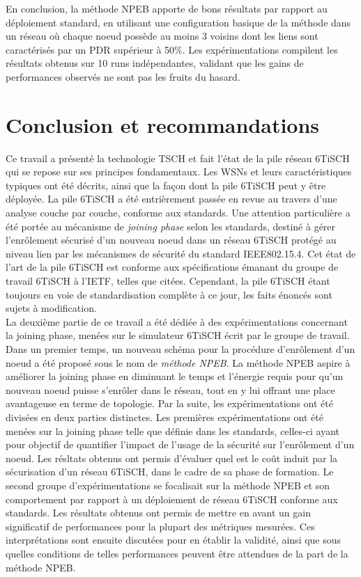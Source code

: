 \documentclass[]{report}
\begin{document}
En conclusion, la méthode NPEB apporte de bons résultats par rapport au déploiement standard, en utilisant une configuration basique de la méthode dans un réseau où chaque noeud possède au moins 3 voisins dont les liens sont caractérisés par un PDR supérieur à 50\%. Les expérimentations compilent les résultats obtenus sur 10 runs indépendantes, validant que les gains de performances observés ne sont pas les fruits du hasard.

\chapter*{Conclusion et recommandations}

\large

Ce travail a présenté la technologie TSCH et fait l'état de la pile réseau 6TiSCH qui se repose sur ses principes fondamentaux. Les WSNs et leurs caractéristiques typiques ont été décrits, ainsi que la façon dont la pile 6TiSCH peut y être déployée. La pile 6TiSCH a été entrièrement passée en revue au travers d'une analyse couche par couche, conforme aux standards. Une attention particulière a été portée au mécanisme de \textit{joining phase} selon les standards, destiné à gérer l'enrôlement sécurisé d'un nouveau noeud dans un réseau 6TiSCH protégé au niveau lien par les mécanismes de sécurité du standard IEEE802.15.4. Cet état de l'art de la pile 6TiSCH est conforme aux spécifications émanant du groupe de travail 6TiSCH à l'IETF, telles que citées. Cependant, la pile 6TiSCH étant toujours en voie de standardisation complète à ce jour, les faits énoncés sont sujets à modification.\\

La deuxième partie de ce travail a été dédiée à des expérimentations concernant la joining phase, menées sur le simulateur 6TiSCH écrit par le groupe de travail. Dans un premier temps, un nouveau schéma pour la procédure d'enrôlement d'un noeud a été proposé sous le nom de \textit{méthode NPEB}. La méthode NPEB aspire à améliorer la joining phase en diminuant le temps et l'énergie requis pour qu'un nouveau noeud puisse s'enrôler dans le réseau, tout en y lui offrant une place avantageuse en terme de topologie. Par la suite, les expérimentations ont été divisées en deux parties distinctes. Les premières expérimentations ont été menées sur la joining phase telle que définie dans les standards, celles-ci ayant pour objectif de quantifier l'impact de l'usage de la sécurité sur l'enrôlement d'un noeud. Les résltats obtenus ont permis d'évaluer quel est le coût induit par la sécurisation d'un réseau 6TiSCH, dans le cadre de sa phase de formation. Le second groupe d'expérimentations se focalisait sur la méthode NPEB et son comportement par rapport à un déploiement de réseau 6TiSCH conforme aux standards. Les résultats obtenus ont permis de mettre en avant un gain significatif de performances pour la plupart des métriques mesurées. Ces interprétations sont ensuite discutées pour en établir la validité, ainsi que sous quelles conditions de telles performances peuvent être attendues de la part de la méthode NPEB.

\normalsize



\end{document}
